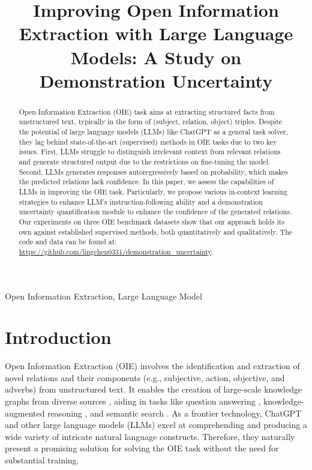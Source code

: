 \documentclass{article}
\title{Improving Open Information Extraction with Large Language Models: A Study on Demonstration Uncertainty}
\begin{document}
\address{$^1$Emory University,
$^2$NEC Labs,
$^3$Microsoft,
$^4$NEC Corporation
}
\maketitle
\begin{abstract}
Open Information Extraction (OIE) task aims at extracting structured facts from unstructured text, typically in the form of (subject, relation, object) triples. Despite the potential of large language models (LLMs) like ChatGPT as a general task solver, they lag behind state-of-the-art (supervised) methods in OIE tasks due to two key issues. First, LLMs struggle to distinguish irrelevant context from relevant relations and generate structured output due to the restrictions on fine-tuning the model. Second, LLMs generates responses autoregressively based on probability, which makes the predicted relations lack confidence. In this paper, we assess the capabilities of LLMs in improving the OIE task. Particularly, we propose various in-context learning strategies to enhance LLM's instruction-following ability and a demonstration uncertainty quantification module to enhance the confidence of the generated relations. Our experiments on three OIE benchmark datasets show that our approach holds its own against established supervised methods, both quantitatively and qualitatively. 
The code and data can be found at: \url{https://github.com/lingchen0331/demonstration_uncertainty}.
\end{abstract}
\begin{keywords}
Open Information Extraction, Large Language Model
\end{keywords}
\section{Introduction}
Open Information Extraction (OIE) \cite{zhou2022survey} involves the identification and extraction of novel relations and their components (e.g., subjective, action, objective, and adverbs) from unstructured text. It enables the creation of large-scale knowledge graphs from diverse sources \cite{wang2018information}, aiding in tasks like question answering \cite{ling2023knowledge}, knowledge-augmented reasoning \cite{chowdhury2023knowledge}, and semantic search \cite{niklaus2018survey}. As a frontier technology, ChatGPT \cite{ouyang2022training} and other large language models (LLMs) \cite{ling2023beyond} excel at comprehending and producing a wide variety of intricate natural language constructs. Therefore, they naturally present a promising solution for solving the OIE task without the need for substantial training. 
\end{document}
